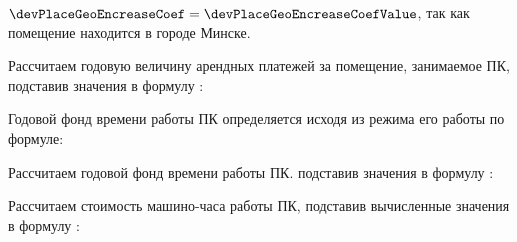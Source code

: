\(\devPlaceGeoEncreaseCoef = \devPlaceGeoEncreaseCoefValue\), так как помещение находится в городе Минске.

Рассчитаем годовую величину арендных платежей за помещение, занимаемое ПК, подставив значения в формулу :
\devPlaceRentCostFormulaApplied

Годовой фонд времени работы ПК определяется исходя из режима его работы по формуле:
\pcWorkabilityFundEquation

Рассчитаем годовой фонд времени работы ПК. подставив значения в формулу :
\pcWorkabilityFundFormulaApplied

Рассчитаем стоимость машино-часа работы ПК, подставив вычисленные значения в формулу :
\pcHourCostFormulaApplied